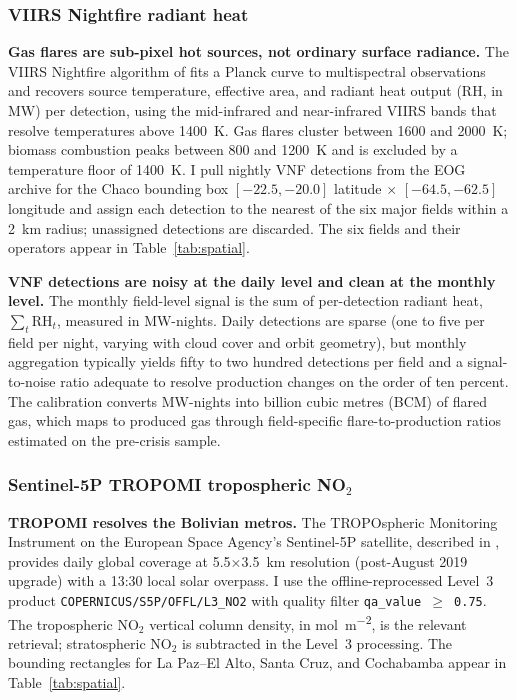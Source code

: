 \documentclass[11pt,letterpaper]{article}
\newcommand{\claim}[1]{\textbf{#1.}}
\begin{document}
\subsubsection{VIIRS Nightfire radiant heat}

\claim{Gas flares are sub-pixel hot sources, not ordinary surface radiance} The VIIRS Nightfire algorithm of \citet{elvidge_vnf2013} fits a Planck curve to multispectral observations and recovers source temperature, effective area, and radiant heat output (RH, in MW) per detection, using the mid-infrared and near-infrared VIIRS bands that resolve temperatures above \num{1400}~K. Gas flares cluster between \num{1600} and \num{2000}~K; biomass combustion peaks between \num{800} and \num{1200}~K and is excluded by a temperature floor of \num{1400}~K. I pull nightly VNF detections from the EOG archive for the Chaco bounding box $[-22.5, -20.0]$ latitude $\times$ $[-64.5, -62.5]$ longitude and assign each detection to the nearest of the six major fields within a \num{2}~km radius; unassigned detections are discarded. The six fields and their operators appear in Table~\ref{tab:spatial}.

\claim{VNF detections are noisy at the daily level and clean at the monthly level} The monthly field-level signal is the sum of per-detection radiant heat, $\textstyle \sum_t \text{RH}_t$, measured in MW-nights. Daily detections are sparse (one to five per field per night, varying with cloud cover and orbit geometry), but monthly aggregation typically yields fifty to two hundred detections per field and a signal-to-noise ratio adequate to resolve production changes on the order of ten percent. The \citet{elvidge_energies2016} calibration converts MW-nights into billion cubic metres (BCM) of flared gas, which maps to produced gas through field-specific flare-to-production ratios estimated on the pre-crisis sample.

\subsubsection{Sentinel-5P TROPOMI tropospheric NO$_2$}

\claim{TROPOMI resolves the Bolivian metros} The TROPOspheric Monitoring Instrument on the European Space Agency's Sentinel-5P satellite, described in \citet{veefkind2012}, provides daily global coverage at \num{5.5}$\times$\num{3.5}~km resolution (post-August \num{2019} upgrade) with a \num{13}:\num{30} local solar overpass. I use the offline-reprocessed Level~3 product \texttt{COPERNICUS/S5P/OFFL/L3\_NO2} with quality filter \texttt{qa\_value $\geq$ 0.75}. The tropospheric NO$_2$ vertical column density, in \unit{mol\per m\squared}, is the relevant retrieval; stratospheric NO$_2$ is subtracted in the Level~3 processing. The bounding rectangles for La Paz--El Alto, Santa Cruz, and Cochabamba appear in Table~\ref{tab:spatial}.
\end{document}
